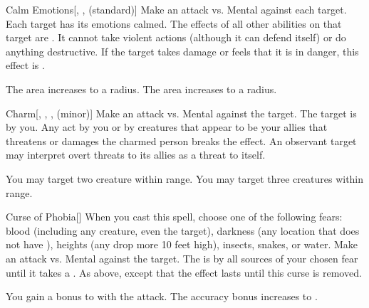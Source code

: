 \lowercase{\hypertarget{spell:Calm Emotions}{}}\label{spell:Calm Emotions}
\begin{freeability}[Rank 3]{\hypertarget{spell:Calm Emotions}{Calm Emotions}}[, ,  (standard)]
Make an attack vs. Mental against each target.
\hit Each target has its emotions calmed.
The effects of all other  abilities on that target are .
It cannot take violent actions (although it can defend itself) or do anything destructive.
If the target takes damage or feels that it is in danger, this effect is .

\rankline
{} The area increases to a \areahuge radius.
 The area increases to a \areaext radius.

\end{freeability}
\vspace{0.25em}



\lowercase{\hypertarget{spell:Charm}{}}\label{spell:Charm}
\begin{freeability}[Rank 3]{\hypertarget{spell:Charm}{Charm}}[, , ,  (minor)]
Make an attack vs. Mental against the target.
\hit The target is \charmed by you.
Any act by you or by creatures that appear to be your allies that threatens or damages the charmed person breaks the effect.
An observant target may interpret overt threats to its allies as a threat to itself.

\rankline
{} You may target two creature within range.
 You may target three creatures within range.

\end{freeability}
\vspace{0.25em}



\lowercase{\hypertarget{spell:Curse of Phobia}{}}\label{spell:Curse of Phobia}
\begin{freeability}[Rank 3]{\hypertarget{spell:Curse of Phobia}{Curse of Phobia}}[]
When you cast this spell, choose one of the following fears: blood (including any  creature, even the target), darkness (any location that does not have ), heights (any drop more 10 feet high), insects, snakes, or water.
Make an attack vs. Mental against the target.
\hit The is  by all sources of your chosen fear until it takes a .
\crit As above, except that the effect lasts until this curse is removed.

\rankline
{} You gain a  bonus to  with the attack.
 The accuracy bonus increases to .

\end{freeability}
\vspace{0.25em}



